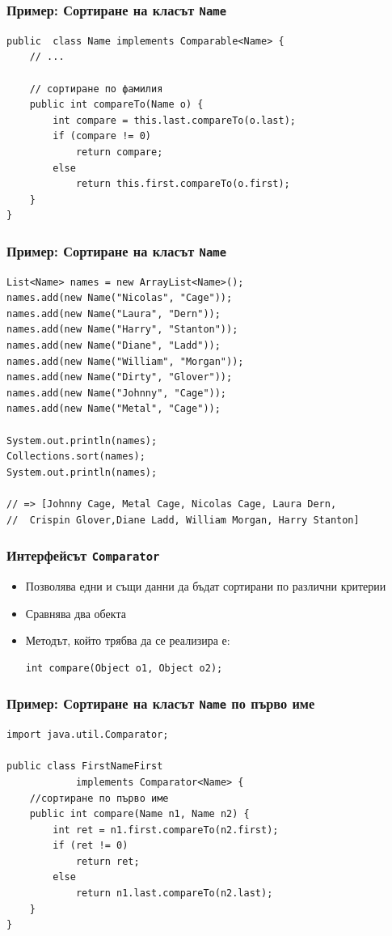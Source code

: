 \documentclass[ignorenonframetext, hyperref=unicode,compress]{beamer}
\begin{document}
\begin{frame}[containsverbatim]\frametitle{Пример: Сортиране на класът \lstinline{Name}}
\begin{lstlisting}
public  class Name implements Comparable<Name> {
	// ...

 	// сортиране по фамилия
 	public int compareTo(Name o) {
 		int compare = this.last.compareTo(o.last);
 		if (compare != 0)
 			return compare;
 		else
 			return this.first.compareTo(o.first);
	}
}
\end{lstlisting}
\end{frame}

\begin{frame}[containsverbatim]\frametitle{Пример: Сортиране на класът \lstinline{Name}}
\begin{lstlisting}
List<Name> names = new ArrayList<Name>();
names.add(new Name("Nicolas", "Cage"));
names.add(new Name("Laura", "Dern"));
names.add(new Name("Harry", "Stanton"));
names.add(new Name("Diane", "Ladd"));
names.add(new Name("William", "Morgan"));
names.add(new Name("Dirty", "Glover"));
names.add(new Name("Johnny", "Cage"));
names.add(new Name("Metal", "Cage"));

System.out.println(names);
Collections.sort(names);
System.out.println(names);

// => [Johnny Cage, Metal Cage, Nicolas Cage, Laura Dern,
//  Crispin Glover,Diane Ladd, William Morgan, Harry Stanton]
\end{lstlisting}
\end{frame}

\begin{frame}[containsverbatim]\frametitle{Интерфейсът \lstinline{Comparator}}
\begin{itemize}
\item Позволява едни и същи данни да бъдат сортирани по различни критерии
\item Сравнява два обекта
\item Методът, който трябва да се реализира е:
\begin{lstlisting}
int compare(Object o1, Object o2); 
\end{lstlisting}
\end{itemize}
\end{frame}


\begin{frame}[containsverbatim]\frametitle{Пример: Сортиране на класът \lstinline{Name} по първо име}
\begin{lstlisting}
import java.util.Comparator;

public class FirstNameFirst 
			implements Comparator<Name> {
 	//сортиране по първо име
 	public int compare(Name n1, Name n2) {
 		int ret = n1.first.compareTo(n2.first);
 		if (ret != 0)
 			return ret;
 		else
 			return n1.last.compareTo(n2.last);
	}
}
\end{lstlisting}
\end{frame}
\end{document}
